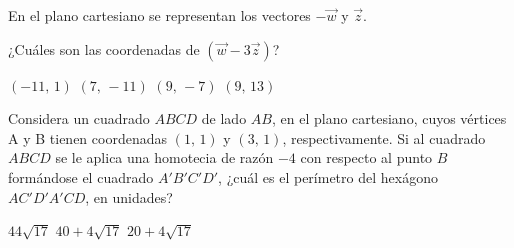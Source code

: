 \documentclass[sin nombre]{srs}
\begin{document}
\begin{preguntas}[after-item-skip=1cm]
\pregunta En el plano cartesiano se representan los vectores $-\vec{w}$ y $\vec{z}$.
\begin{centrado}
\end{centrado}
¿Cuáles son las coordenadas de $\left(\vec{w}-3\vec{z}\right)$?
\begin{vertical}
\alternativa $\left(-11,\,1\right)$
\alternativa $\left(7,\,-11\right)$
\alternativa $\left(9,\,-7\right)$
\alternativa $\left(9,\,13\right)$
\end{vertical}

\pregunta Considera un cuadrado $ABCD$ de lado $AB$, en el plano cartesiano,
cuyos vértices A y B tienen coordenadas $\left(1,\,1\right)$ y
$\left(3,\,1\right)$, respectivamente.
Si al cuadrado $ABCD$ se le aplica una homotecia de razón $-4$ con
respecto al punto $B$ formándose el cuadrado $A'B'C'D'$, ¿cuál es el
perímetro del hexágono $AC'D'A'CD$, en unidades?
\begin{vertical}
\alternativa $44\sqrt{17}$
\alternativa $40 + 4\sqrt{17}$
\alternativa $20 + 4\sqrt{17}$
\end{vertical}


\end{preguntas}
\end{document}
